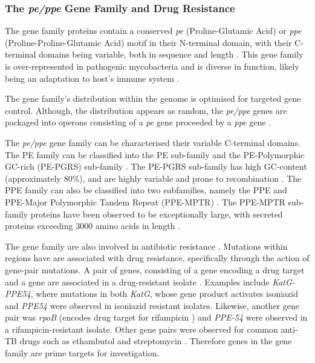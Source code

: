 \subsubsection{The \textit{pe/ppe} Gene Family and Drug Resistance}

The \ppe gene family proteins contain a conserved \textit{pe} (Proline-Glutamic Acid) or \textit{ppe} (Proline-Proline-Glutamic Acid) motif in their N-terminal domain, with their C-terminal domains being variable, both in sequence and length \cite{d2023pe, cole1998deciphering}. This gene family is over-represented in pathogenic mycobacteria \cite{d2023pe, gagneux2018} and is diverse in function, likely being an adaptation to host's immune system \cite{de2019immune}. 

The \ppe gene family's distribution within the genome is optimised for targeted gene control. Although, the distribution appears as random, the \textit{pe/ppe} genes are packaged into operons consisting of a \textit{pe} gene proceeded by a \textit{ppe} gene \cite{d2023pe, tundup2006clusters}. 

The \textit{pe/ppe} gene family can be characterised their variable C-terminal domains. The PE family can be classified into the PE sub-family and the PE-Polymorphic GC-rich (PE-PGRS) sub-family \cite{cole1998deciphering,gey2006evolution}.  The PE-PGRS sub-family has high GC-content (approximately 80\%), and are highly variable and prone to recombination \cite{gey2006evolution, daleke2012general}. The PPE family can also be classified into two subfamilies, namely the PPE and PPE-Major Polymorphic Tandem Repeat (PPE-MPTR) \cite{cole1998deciphering,gey2006evolution}. The PPE-MPTR sub-family proteins have been observed to be exceptionally large, with secreted proteins exceeding 3000 amino acids in length \cite{hermans1992characterization,cole1998deciphering, gey2006evolution}. 

The \ppe gene family are also involved in antibiotic resistance \cite{d2023pe}. Mutations within \ppe regions have are associated with drug resistance, specifically through the action of gene-pair mutations. A pair of genes, consisting of a gene encoding a drug target and a \ppe gene are associated in a drug-resistant isolate \cite{d2023pe}. Examples include \textit{KatG-PPE54}, where mutations in both \textit{KatG}, whose gene product activates isoniazid \cite{islam2017drug} and \textit{PPE54} were observed in isoniazid resistant isolates. Likewise, another gene pair was \textit{rpoB} (encodes drug target for rifampicin \cite{islam2017drug}) and \textit{PPE-54} were observed in a rifampicin-resistant isolate. Other gene pairs were observed for common anti-TB drugs such as ethambutol and streptomycin \cite{cui2016bioinformatics}. Therefore genes in the \ppe gene family are prime targets for investigation. 

